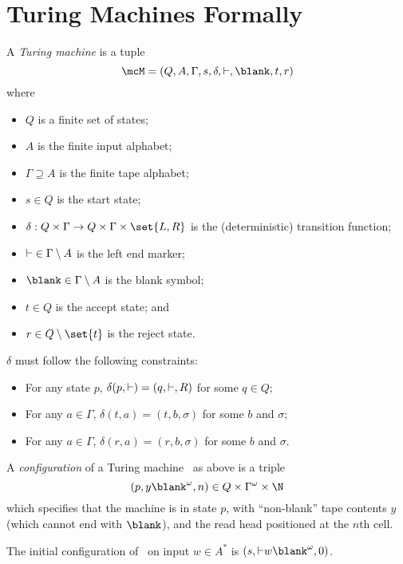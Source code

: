 \section{Turing Machines Formally} \label{sec:tm:formal}
\begin{definition*} \label{def:tm}
    A \emph{Turing machine} is a tuple \[
        \mcM = (Q, A, \Gamma, s, \delta, \leftend, \blank, t, r)
    \] where
    \begin{itemize}
        \item $Q$ is a finite set of states;
        \item $A$ is the finite input alphabet;
        \item $\Gamma \supseteq A$ is the finite tape alphabet;
        \item $s \in Q$ is the start state;
        \item $\delta: Q \times \Gamma \to Q \times \Gamma \times \set{L, R}$
        is the (deterministic) transition function;
        \item ${\vdash} \in \Gamma \setminus A$ is the left end marker;
        \item $\blank \in \Gamma \setminus A$ is the blank symbol;
        \item $t \in Q$ is the accept state; and
        \item $r \in Q \setminus \set{t}$ is the reject state.
    \end{itemize}
    $\delta$ must follow the following constraints:
    \begin{itemize}
        \item For any state $p$,
        $\delta(p, {\vdash}) = (q, {\vdash}, R)$ for some $q \in Q$;
        \item For any $a \in \Gamma$, $\delta(t, a) = (t, b, \sigma)$ for 
        some $b$ and $\sigma$;
        \item For any $a \in \Gamma$, $\delta(r, a) = (r, b, \sigma)$ for
        some $b$ and $\sigma$.
    \end{itemize}
\end{definition*}

\begin{definition}[Configuration] \label{def:tm:configuration}
    A \emph{configuration} of a Turing machine \mcM\ as above is a triple \[
        (p, y\blank^\omega, n) \in Q \times \Gamma^\omega \times \N
    \] which specifies that the machine is in state $p$,
    with ``non-blank'' tape contents $y$ (which cannot end with $\blank$),
    and the read head positioned at the $n$th cell.
\end{definition}
\begin{remark}
    The initial configuration of \mcM\ on input $w \in A^*$ is
    $(s, \leftend w \blank^\omega, 0)$.
\end{remark}

